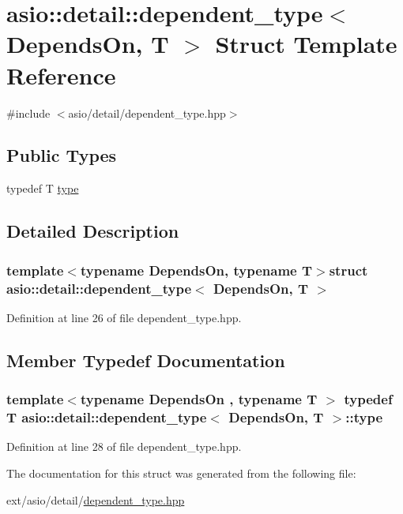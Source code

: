 \hypertarget{structasio_1_1detail_1_1dependent__type}{}\section{asio\+:\+:detail\+:\+:dependent\+\_\+type$<$ Depends\+On, T $>$ Struct Template Reference}
\label{structasio_1_1detail_1_1dependent__type}


{\ttfamily \#include $<$asio/detail/dependent\+\_\+type.\+hpp$>$}

\subsection*{Public Types}
\begin{DoxyCompactItemize}
\item 
typedef T \hyperlink{structasio_1_1detail_1_1dependent__type_a0086211bddc1f8292f039c25169cd41c}{type}
\end{DoxyCompactItemize}


\subsection{Detailed Description}
\subsubsection*{template$<$typename Depends\+On, typename T$>$struct asio\+::detail\+::dependent\+\_\+type$<$ Depends\+On, T $>$}



Definition at line 26 of file dependent\+\_\+type.\+hpp.



\subsection{Member Typedef Documentation}
\hypertarget{structasio_1_1detail_1_1dependent__type_a0086211bddc1f8292f039c25169cd41c}{}
\subsubsection[{type}]{\setlength{\rightskip}{0pt plus 5cm}template$<$typename Depends\+On , typename T $>$ typedef T {\bf asio\+::detail\+::dependent\+\_\+type}$<$ Depends\+On, T $>$\+::{\bf type}}\label{structasio_1_1detail_1_1dependent__type_a0086211bddc1f8292f039c25169cd41c}


Definition at line 28 of file dependent\+\_\+type.\+hpp.



The documentation for this struct was generated from the following file\+:\begin{DoxyCompactItemize}
\item 
ext/asio/detail/\hyperlink{dependent__type_8hpp}{dependent\+\_\+type.\+hpp}\end{DoxyCompactItemize}
